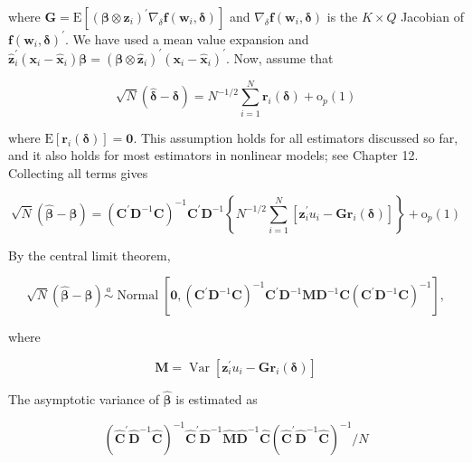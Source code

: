\documentclass[10pt]{article}
\begin{document}
where $\mathbf{G}=\mathrm{E}\left[\left(\boldsymbol{\beta} \otimes \mathbf{z}_{i}\right)^{\prime} \nabla_{\delta} \mathbf{f}\left(\mathbf{w}_{i}, \boldsymbol{\delta}\right)\right]$ and $\nabla_{\delta} \mathbf{f}\left(\mathbf{w}_{i}, \boldsymbol{\delta}\right)$ is the $K \times Q$ Jacobian of $\mathbf{f}\left(\mathbf{w}_{i}, \boldsymbol{\delta}\right)^{\prime}$. We have used a mean value expansion and $\hat{\mathbf{z}}_{i}^{\prime}\left(\mathbf{x}_{i}-\hat{\mathbf{x}}_{i}\right) \boldsymbol{\beta}=\left(\boldsymbol{\beta} \otimes \hat{\mathbf{z}}_{i}\right)^{\prime}\left(\mathbf{x}_{i}-\hat{\mathbf{x}}_{i}\right)^{\prime}$. Now, assume that

$$
\sqrt{N}(\hat{\boldsymbol{\delta}}-\boldsymbol{\delta})=N^{-1 / 2} \sum_{i=1}^{N} \mathbf{r}_{i}(\boldsymbol{\delta})+\mathrm{o}_{p}(1)
$$

where $\mathrm{E}\left[\mathbf{r}_{i}(\boldsymbol{\delta})\right]=\mathbf{0}$. This assumption holds for all estimators discussed so far, and it also holds for most estimators in nonlinear models; see Chapter 12. Collecting all terms gives

$$
\sqrt{N}(\hat{\boldsymbol{\beta}}-\boldsymbol{\beta})=\left(\mathbf{C}^{\prime} \mathbf{D}^{-1} \mathbf{C}\right)^{-1} \mathbf{C}^{\prime} \mathbf{D}^{-1}\left\{N^{-1 / 2} \sum_{i=1}^{N}\left[\mathbf{z}_{i}^{\prime} u_{i}-\mathbf{G r}_{i}(\boldsymbol{\delta})\right]\right\}+\mathrm{o}_{p}(1)
$$

By the central limit theorem,

$$
\sqrt{N}(\hat{\boldsymbol{\beta}}-\boldsymbol{\beta}) \stackrel{a}{\sim} \operatorname{Normal}\left[\mathbf{0},\left(\mathbf{C}^{\prime} \mathbf{D}^{-1} \mathbf{C}\right)^{-1} \mathbf{C}^{\prime} \mathbf{D}^{-1} \mathbf{M D}^{-1} \mathbf{C}\left(\mathbf{C}^{\prime} \mathbf{D}^{-1} \mathbf{C}\right)^{-1}\right],
$$

where

$$
\mathbf{M}=\operatorname{Var}\left[\mathbf{z}_{i}^{\prime} u_{i}-\mathbf{G r}_{i}(\boldsymbol{\delta})\right]
$$

The asymptotic variance of $\hat{\boldsymbol{\beta}}$ is estimated as


\begin{equation*}
\left(\hat{\mathbf{C}}^{\prime} \hat{\mathbf{D}}^{-1} \hat{\mathbf{C}}\right)^{-1} \hat{\mathbf{C}}^{\prime} \hat{\mathbf{D}}^{-1} \hat{\mathbf{M}} \hat{\mathbf{D}}^{-1} \hat{\mathbf{C}}\left(\hat{\mathbf{C}}^{\prime} \hat{\mathbf{D}}^{-1} \hat{\mathbf{C}}\right)^{-1} / N \tag{6.58}
\end{equation*}
\end{document}
